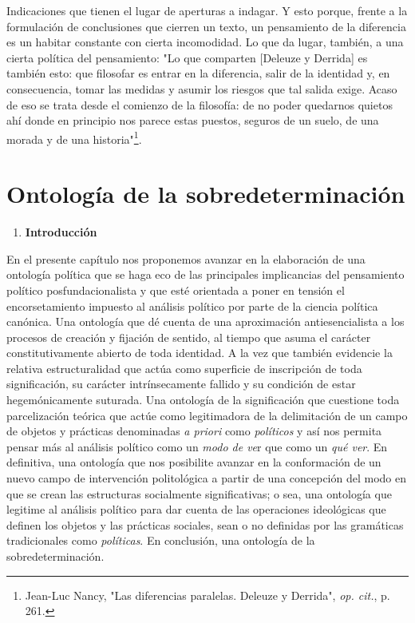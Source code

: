\documentclass{book}
\begin{document}
Indicaciones que tienen el lugar de aperturas a indagar. Y esto porque,
frente a la formulación de conclusiones que cierren un texto, un
pensamiento de la diferencia es un habitar constante con cierta
incomodidad. Lo que da lugar, también, a una cierta política del
pensamiento: "Lo que comparten {[}Deleuze y Derrida{]} es también esto:
que filosofar es entrar en la diferencia, salir de la identidad y, en
consecuencia, tomar las medidas y asumir los riesgos que tal salida
exige. Acaso de eso se trata desde el comienzo de la filosofía: de no
poder quedarnos quietos ahí donde en principio nos parece estas puestos,
seguros de un suelo, de una morada y de una historia"\footnote{Jean-Luc
  Nancy, "Las diferencias paralelas. Deleuze y Derrida", \emph{op.
  cit.}, p. 261.}.

\chapter{Ontología de la sobredeterminación}


\begin{enumerate}
\def\labelenumi{\arabic{enumi}.}
\item
  \textbf{Introducción}
\end{enumerate}

En el presente capítulo nos proponemos avanzar en la elaboración de una
ontología política que se haga eco de las principales implicancias del
pensamiento político posfundacionalista y que esté orientada a poner en
tensión el encorsetamiento impuesto al análisis político por parte de la
ciencia política canónica. Una ontología que dé cuenta de una
aproximación antiesencialista a los procesos de creación y fijación de
sentido, al tiempo que asuma el carácter constitutivamente abierto de
toda identidad. A la vez que también evidencie la relativa
estructuralidad que actúa como superficie de inscripción de toda
significación, su carácter intrínsecamente fallido y su condición de
estar hegemónicamente suturada. Una ontología de la significación que
cuestione toda parcelización teórica que actúe como legitimadora de la
delimitación de un campo de objetos y prácticas denominadas \emph{a
priori} como \emph{políticos} y así nos permita pensar más al análisis
político como un \emph{modo de ve}r que como un \emph{qué ver}. En
definitiva, una ontología que nos posibilite avanzar en la conformación
de un nuevo campo de intervención politológica a partir de una
concepción del modo en que se crean las estructuras socialmente
significativas; o sea, una ontología que legitime al análisis político
para dar cuenta de las operaciones ideológicas que definen los objetos y
las prácticas sociales, sean o no definidas por las gramáticas
tradicionales como \emph{políticas}. En conclusión, una ontología de la
sobredeterminación.
\end{document}

